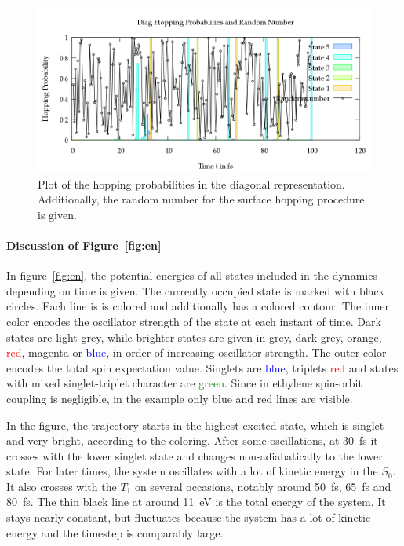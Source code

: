 \documentclass[a4paper,11pt,DIV=15,openany]{scrbook}
\begin{document}
\begin{figure}[p]
  \centering
  \includegraphics[width=\textwidth]{figures/prob.png}
  \caption{Plot of the hopping probabilities in the diagonal representation. Additionally, the random number for the surface hopping procedure is given.}
  \label{fig:prob}
\end{figure}

\paragraph{Discussion of Figure~\ref{fig:en}}

In figure~\ref{fig:en}, the potential energies of all states included in the dynamics depending on time is given. The currently occupied state is marked with black circles. Each line is is colored and additionally has a colored contour. The inner color encodes the oscillator strength of the state at each instant of time. Dark states are \textcolor{black!20}{light grey}, while brighter states are given in \textcolor{black!40}{grey}, \textcolor{black!70}{dark grey}, \textcolor{red!60!green}{orange}, \textcolor{red}{red}, \textcolor{red!50!blue}{magenta} or \textcolor{blue}{blue}, in order of increasing oscillator strength. The outer color encodes the total spin expectation value. Singlets are \textcolor{blue}{blue}, triplets \textcolor{red}{red} and states with mixed singlet-triplet character are \textcolor{green}{green}. Since in ethylene spin-orbit coupling is negligible, in the example only blue and red lines are visible.

In the figure, the trajectory starts in the highest excited state, which is singlet and very bright, according to the coloring. After some oscillations, at 30~fs it crosses with the lower singlet state and changes non-adiabatically to the lower state. For later times, the system oscillates with a lot of kinetic energy in the $S_0$. It also crosses with the $T_1$ on several occasions, notably around 50~fs, 65~fs and 80~fs. The thin black line at around 11~eV is the total energy of the system. It stays nearly constant, but fluctuates because the system has a lot of kinetic energy and the timestep is comparably large.
\end{document}
